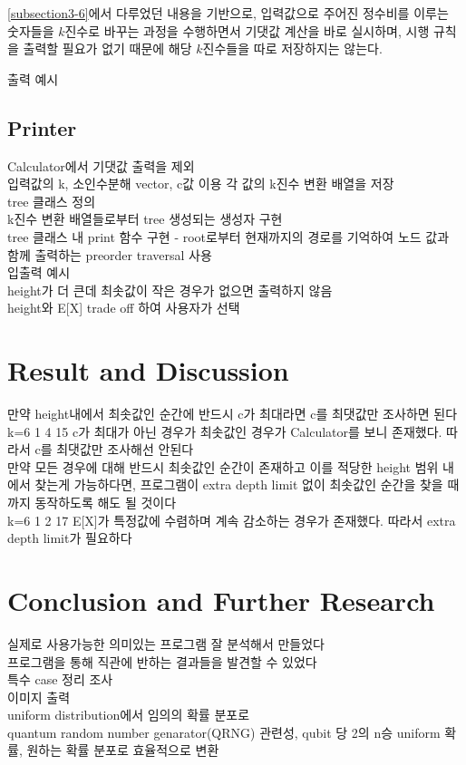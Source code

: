 \documentclass[11pt]{article}
\begin{document}
\ref{subsection3-6}에서 다루었던 내용을 기반으로, 입력값으로 주어진 정수비를 이루는 숫자들을 $k$진수로 바꾸는 과정을 수행하면서 기댓값 계산을 바로 실시하며, 시행 규칙을 출력할 필요가 없기 때문에 해당 $k$진수들을 따로 저장하지는 않는다.

출력 예시

\subsection{Printer}
Calculator에서 기댓값 출력을 제외\\
입력값의 k, 소인수분해 vector, c값 이용 각 값의 k진수 변환 배열을 저장\\
tree 클래스 정의\\
k진수 변환 배열들로부터 tree 생성되는 생성자 구현\\
tree 클래스 내 print 함수 구현 - root로부터 현재까지의 경로를 기억하여 노드 값과 함께 출력하는 preorder traversal 사용\\
입출력 예시\\
height가 더 큰데 최솟값이 작은 경우가 없으면 출력하지 않음\\
height와 E[X] trade off 하여 사용자가 선택

\section{Result and Discussion}

만약 height내에서 최솟값인 순간에 반드시 c가 최대라면 c를 최댓값만 조사하면 된다\\
k=6 {1 4 15} c가 최대가 아닌 경우가 최솟값인 경우가 Calculator를 보니 존재했다. 따라서 c를 최댓값만 조사해선 안된다\\

만약 모든 경우에 대해 반드시 최솟값인 순간이 존재하고 이를 적당한 height 범위 내에서 찾는게 가능하다면, 프로그램이 extra depth limit 없이 최솟값인 순간을 찾을 때까지 동작하도록 해도 될 것이다\\
k=6 {1 2 17} E[X]가 특정값에 수렴하며 계속 감소하는 경우가 존재했다. 따라서 extra depth limit가 필요하다\\

\section{Conclusion and Further Research}
실제로 사용가능한 의미있는 프로그램 잘 분석해서 만들었다\\
프로그램을 통해 직관에 반하는 결과들을 발견할 수 있었다\\
특수 case 정리 조사\\
이미지 출력\\
uniform distribution에서 임의의 확률 분포로\\
quantum random number genarator(QRNG) 관련성, qubit 당 2의 n승 uniform 확률, 원하는 확률 분포로 효율적으로 변환\\
\end{document}
